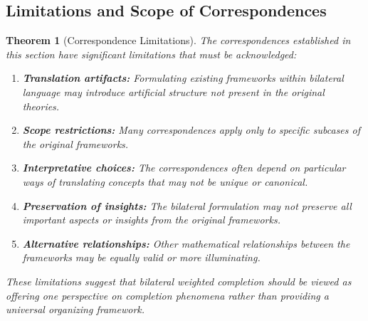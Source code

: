 \documentclass[11pt]{article}
\theoremstyle{plain}
\newtheorem{theorem}{Theorem}[section]
\theoremstyle{definition}
\theoremstyle{remark}
\begin{document}
\subsection{Limitations and Scope of Correspondences}

\begin{theorem}[Correspondence Limitations]\label{thm:correspondence-limitations}
The correspondences established in this section have significant limitations that must be acknowledged:

\begin{enumerate}
\item \textbf{Translation artifacts:} Formulating existing frameworks within bilateral language may introduce artificial structure not present in the original theories.

\item \textbf{Scope restrictions:} Many correspondences apply only to specific subcases of the original frameworks.

\item \textbf{Interpretative choices:} The correspondences often depend on particular ways of translating concepts that may not be unique or canonical.

\item \textbf{Preservation of insights:} The bilateral formulation may not preserve all important aspects or insights from the original frameworks.

\item \textbf{Alternative relationships:} Other mathematical relationships between the frameworks may be equally valid or more illuminating.
\end{enumerate}

These limitations suggest that bilateral weighted completion should be viewed as offering one perspective on completion phenomena rather than providing a universal organizing framework.
\end{theorem}
\end{document}
